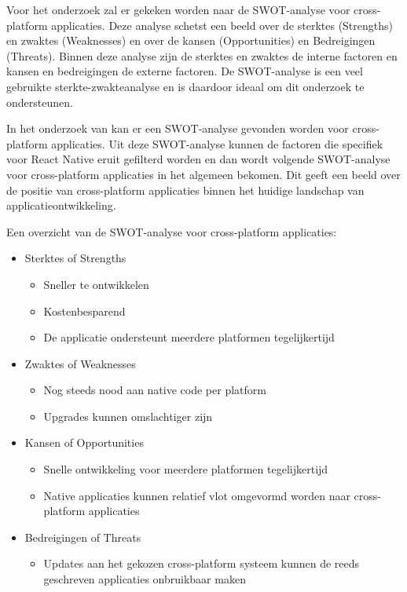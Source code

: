 Voor het onderzoek zal er gekeken worden naar de SWOT-analyse voor cross-platform applicaties. Deze analyse schetst een beeld over de sterktes (Strengths) en zwaktes (Weaknesses) en over de kansen (Opportunities) en Bedreigingen (Threats). Binnen deze analyse zijn de sterktes en zwaktes de interne factoren en kansen en bedreigingen de externe factoren.\autocite{Leigh2010} De SWOT-analyse is een veel gebruikte sterkte-zwakteanalyse en is daardoor ideaal om dit onderzoek te ondersteunen.

In het onderzoek van \textcite{Nivanaho2019} kan er een SWOT-analyse gevonden worden voor cross-platform applicaties. Uit deze SWOT-analyse kunnen de factoren die specifiek voor React Native eruit gefilterd worden en dan wordt volgende SWOT-analyse voor cross-platform applicaties in het algemeen bekomen. Dit geeft een beeld over de positie van cross-platform applicaties binnen het huidige landschap van applicatieontwikkeling.

Een overzicht van de SWOT-analyse voor cross-platform applicaties:
\begin{itemize}
    \item Sterktes of Strengths
    \begin{itemize}
        \item Sneller te ontwikkelen
        \item Kostenbesparend
        \item De applicatie ondersteunt meerdere platformen tegelijkertijd
    \end{itemize}
    \item Zwaktes of Weaknesses
    \begin{itemize}
        \item Nog steeds nood aan native code per platform
        \item Upgrades kunnen omslachtiger zijn
    \end{itemize}
    \item Kansen of Opportunities
    \begin{itemize}
        \item Snelle ontwikkeling voor meerdere platformen tegelijkertijd
        \item Native applicaties kunnen relatief vlot omgevormd worden naar cross-platform applicaties
    \end{itemize}
    \item Bedreigingen of Threats
    \begin{itemize}
        \item Updates aan het gekozen cross-platform systeem kunnen de reeds geschreven applicaties onbruikbaar maken
    \end{itemize}
\end{itemize}

